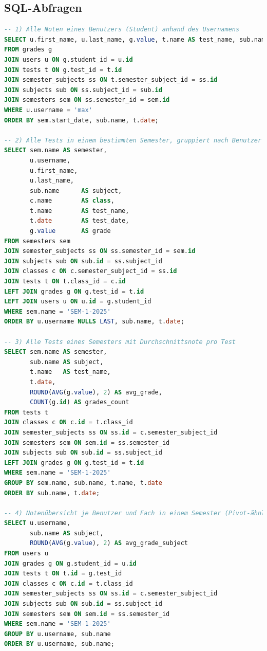\documentclass[12pt,a4paper]{article}
\begin{document}
    \subsection{SQL-Abfragen}
    \begin{lstlisting}[language=SQL]
-- 1) Alle Noten eines Benutzers (Student) anhand des Usernamens
SELECT u.first_name, u.last_name, g.value, t.name AS test_name, sub.name AS subject, sem.name AS semester
FROM grades g
JOIN users u ON g.student_id = u.id
JOIN tests t ON g.test_id = t.id
JOIN semester_subjects ss ON t.semester_subject_id = ss.id
JOIN subjects sub ON ss.subject_id = sub.id
JOIN semesters sem ON ss.semester_id = sem.id
WHERE u.username = 'max'
ORDER BY sem.start_date, sub.name, t.date;

-- 2) Alle Tests in einem bestimmten Semester, gruppiert nach Benutzer (nur Tests, Note optional)
SELECT sem.name AS semester,
       u.username,
       u.first_name,
       u.last_name,
       sub.name      AS subject,
       c.name        AS class,
       t.name        AS test_name,
       t.date        AS test_date,
       g.value       AS grade
FROM semesters sem
JOIN semester_subjects ss ON ss.semester_id = sem.id
JOIN subjects sub ON sub.id = ss.subject_id
JOIN classes c ON c.semester_subject_id = ss.id
JOIN tests t ON t.class_id = c.id
LEFT JOIN grades g ON g.test_id = t.id
LEFT JOIN users u ON u.id = g.student_id
WHERE sem.name = 'SEM-1-2025'
ORDER BY u.username NULLS LAST, sub.name, t.date;

-- 3) Alle Tests eines Semesters mit Durchschnittsnote pro Test
SELECT sem.name AS semester,
       sub.name AS subject,
       t.name   AS test_name,
       t.date,
       ROUND(AVG(g.value), 2) AS avg_grade,
       COUNT(g.id) AS grades_count
FROM tests t
JOIN classes c ON c.id = t.class_id
JOIN semester_subjects ss ON ss.id = c.semester_subject_id
JOIN semesters sem ON sem.id = ss.semester_id
JOIN subjects sub ON sub.id = ss.subject_id
LEFT JOIN grades g ON g.test_id = t.id
WHERE sem.name = 'SEM-1-2025'
GROUP BY sem.name, sub.name, t.name, t.date
ORDER BY sub.name, t.date;

-- 4) Notenübersicht je Benutzer und Fach in einem Semester (Pivot-ähnlich)
SELECT u.username,
       sub.name AS subject,
       ROUND(AVG(g.value), 2) AS avg_grade_subject
FROM users u
JOIN grades g ON g.student_id = u.id
JOIN tests t ON t.id = g.test_id
JOIN classes c ON c.id = t.class_id
JOIN semester_subjects ss ON ss.id = c.semester_subject_id
JOIN subjects sub ON sub.id = ss.subject_id
JOIN semesters sem ON sem.id = ss.semester_id
WHERE sem.name = 'SEM-1-2025'
GROUP BY u.username, sub.name
ORDER BY u.username, sub.name;


\end{lstlisting}
\end{document}

